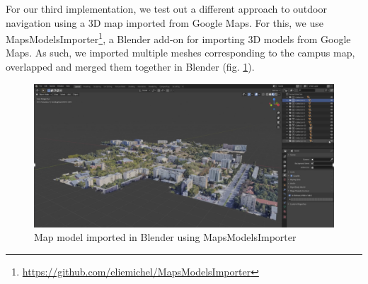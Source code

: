         For our third implementation, we test out a different approach to outdoor navigation using a 3D map imported from Google Maps. For this, we use MapsModelsImporter\footnote{\url{https://github.com/eliemichel/MapsModelsImporter}}, a Blender add-on for importing 3D models from Google Maps. As such, we imported multiple meshes corresponding to the campus map, overlapped and merged them together in Blender (fig. \ref{3:fig:mapsmodelsimporter_blender}).
        
        \begin{figure}[ht]
            \centering
            \includegraphics[width=\textwidth]{figures/demos/mapsmodelsimporter_blender.png}
            \caption{Map model imported in Blender using MapsModelsImporter}
            \label{3:fig:mapsmodelsimporter_blender}
        \end{figure}
        
